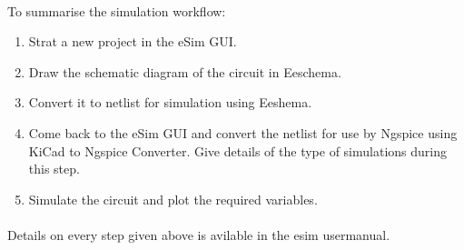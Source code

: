 \paragraph{}To summarise the simulation workflow:

\begin{enumerate}
\item
Strat a new project in the eSim GUI.
\item
Draw the schematic diagram of the circuit in Eeschema.
\item
Convert it to netlist for simulation using Eeshema.
\item
Come back to the eSim GUI and convert the netlist for use by Ngspice using KiCad to Ngspice Converter. Give details of the type of simulations during this step.

\item
Simulate the circuit and plot the required variables.

\end{enumerate}


\paragraph{}

Details on every step given above is avilable in the esim usermanual\cite{esimusermanual}.


